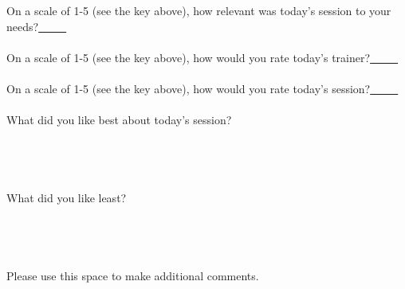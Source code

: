 On a scale of 1-5 (see the key above), how relevant was today's session to your needs?\underline{\ \ \ \ \ }
\ \\
\ \\
On a scale of 1-5 (see the key above), how would you rate today's trainer?\underline{\ \ \ \ \ }
\ \\
\ \\
On a scale of 1-5 (see the key above), how would you rate today's session?\underline{\ \ \ \ \ }
\ \\
\ \\
What did you like best about today's session?
\ \\
\ \\
\ \\
\ \\
\ \\
What did you like least?
\ \\
\ \\
\ \\
\ \\
\ \\
Please use this space to make additional comments.


